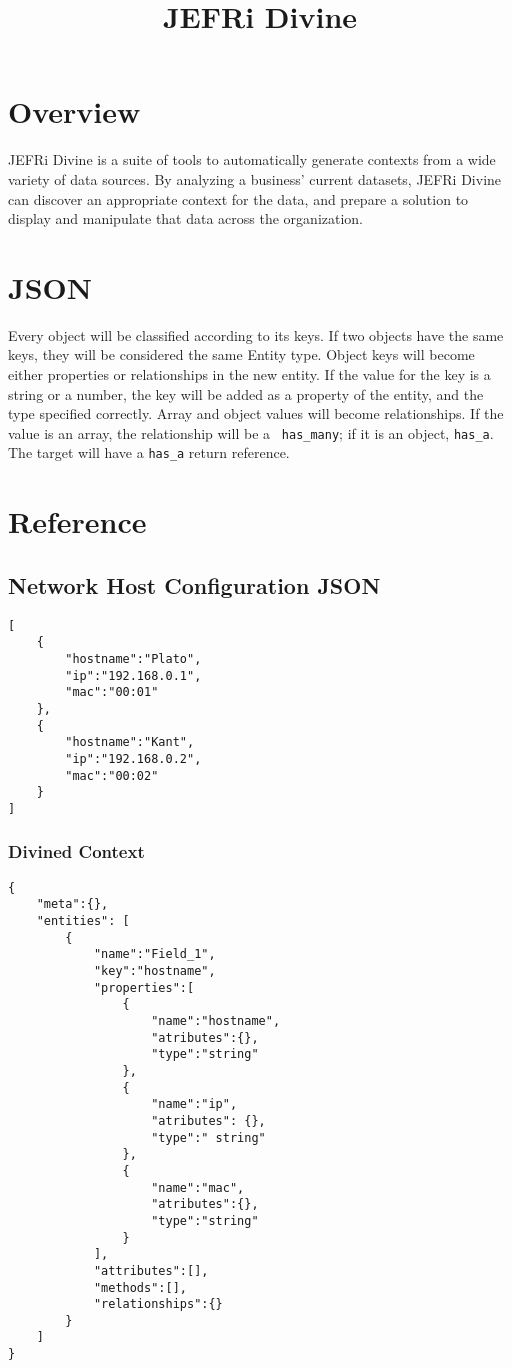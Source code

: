\documentclass{article}
\newcommand{\ilcode}{\tt}
\begin{document}
\title{JEFRi Divine}
\maketitle
\tableofcontents
\newpage
\linespread{1.6}

\section{Overview}

JEFRi Divine is a suite of tools to automatically generate contexts from a
wide variety of data sources. By analyzing a business' current datasets, JEFRi
Divine can discover an appropriate context for the data, and prepare a
solution to display and manipulate that data across the organization.

\section{JSON}

Every object will be classified according to its keys. If two objects have the
same keys, they will be considered the same Entity type. Object keys will
become either properties or relationships in the new entity. If the value for
the key is a string or a number, the key will be added as a property of the
entity, and the type specified correctly. Array and object values will become
relationships. If the value is an array, the relationship will be a {\ilcode
has\_many}; if it is an object, {\ilcode has\_a}. The target will have a
{\ilcode has\_a} return reference.

\section{Reference}

\subsection{Network Host Configuration JSON}
\begin{lstlisting}
[
	{
		"hostname":"Plato",
		"ip":"192.168.0.1",
		"mac":"00:01"
	},
	{
		"hostname":"Kant",
		"ip":"192.168.0.2",
		"mac":"00:02"
	}
]
\end{lstlisting}

\subsubsection{Divined Context}
\begin{lstlisting}
{
	"meta":{},
	"entities": [
		{
			"name":"Field_1",
			"key":"hostname",
			"properties":[
				{
					"name":"hostname",
					"atributes":{},
					"type":"string"
				},
				{
					"name":"ip",
					"atributes": {},
					"type":" string"
				},
				{
					"name":"mac",
					"atributes":{},
					"type":"string"
				}
			],
			"attributes":[],
			"methods":[],
			"relationships":{}
		}
	]
}
\end{lstlisting}
\end{document}
